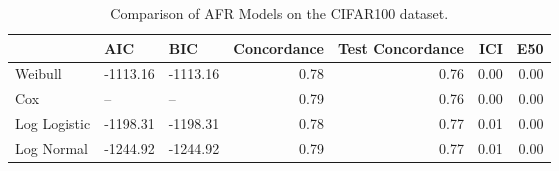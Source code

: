 \begin{table*}
\centering
\caption{Comparison of AFR Models on the CIFAR100 dataset.}
\label{tab:cifar100}
\begin{tabular}{lllrrrr}
\toprule
 & AIC & BIC & Concordance & Test Concordance & ICI & E50 \\
\midrule
Weibull & -1113.16 & -1113.16 & 0.78 & 0.76 & 0.00 & 0.00 \\
Cox & -- & -- & 0.79 & 0.76 & 0.00 & 0.00 \\
Log Logistic & -1198.31 & -1198.31 & 0.78 & 0.77 & 0.01 & 0.00 \\
Log Normal & -1244.92 & -1244.92 & 0.79 & 0.77 & 0.01 & 0.00 \\
\bottomrule
\end{tabular}
\end{table*}
